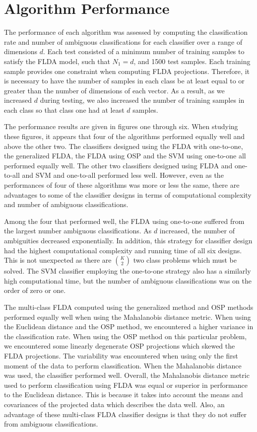 \documentclass[journal]{IEEEtran}
\begin{document}
\section{Algorithm Performance}
\par The performance of each algorithm was assessed by computing the classification rate and number of ambiguous classifications for each classifier over a range of dimensions \(d\). Each test consisted of a minimum number of training samples to satisfy the FLDA model, such that \(N_1=d\), and 1500 test samples. Each training sample provides one constraint when computing FLDA projections. Therefore, it is necessary to have the number of samples in each class be at least equal to or greater than the number of dimensions of each vector. As a result, as we increased \(d\) during testing, we also increased the number of training samples in each class so that class one had at least \(d\) samples.
\par The performance results are given in figures one through six. When studying these figures, it appears that four of the algorithms performed equally well and above the other two. The classifiers designed using the FLDA with one-to-one, the generalized FLDA, the FLDA using OSP and the SVM using one-to-one all performed equally well. The other two classifiers designed using FLDA and one-to-all and SVM and one-to-all performed less well. However, even as the performances of four of these algorithms was more or less the same, there are advantages to some of the classifier designs in terms of computational complexity and number of ambiguous classifications.
\par Among the four that performed well, the FLDA using one-to-one suffered from the largest number ambiguous classifications. As \(d\) increased, the number of ambiguities decreased exponentially. In addition, this strategy for classifier design had the highest computational complexity and running time of all six designs. This is not unexpected as there are \(K \choose 2\) two class problems which must be solved. The SVM classifier employing the one-to-one strategy also has a similarly high computational time, but the number of ambiguous classifications was on the order of zero or one.
\par The multi-class FLDA computed using the generalized method and OSP methods performed equally well when using the Mahalanobis distance metric. When using the Euclidean distance and the OSP method, we encountered a higher variance in the classification rate. When using the OSP method on this particular problem, we encountered some linearly degenerate OSP projections which skewed the FLDA projections. The variability was encountered when using only the first moment of the data to perform classification. When the Mahalanobis distance was used, the classifier performed well. Overall, the Mahalanobis distance metric used to perform classification using FLDA was equal or superior in performance to the Euclidean distance. This is because it takes into account the means and covariances of the projected data which describes the data well. Also, an advantage of these multi-class FLDA classifier designs is that they do not suffer from ambiguous classifications.
\end{document}
